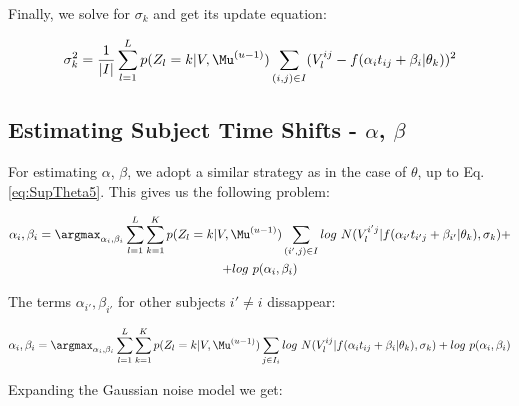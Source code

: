 
Finally, we solve for $\sigma_k$ and get its update equation: 

\begin{equation}
\label{eq:SupThetaFinal}
 \sigma_k^2 = \frac{1}{|I|} \sum_{l=1}^L p(Z_l = k | V, \Mu^{(u-1)}) \sum_{(i,j) \in I} (V_l^{ij} - f(\alpha_i t_{ij} + \beta_i | \theta_k))^2
\end{equation}

% 


\subsection{Estimating Subject Time Shifts - $\alpha$, $\beta$}

For estimating $\alpha$, $\beta$, we adopt a similar strategy as in the case of $\theta$, up to Eq. \ref{eq:SupTheta5}. This gives us the following problem:

\begin{multline}
 \alpha_i, \beta_i = \argmax_{\alpha_i, \beta_i} \sum_{l=1}^L \sum_{k = 1}^K p(Z_l = k | V, \Mu^{(u-1)}) \sum_{(i',j) \in I} log\ N(V_l^{i'j} | f(\alpha_{i'} t_{i'j} + \beta_{i'} | \theta_{k}), \sigma_{k}) + \\ + log\ p(\alpha_i, \beta_i)
\end{multline}

The terms $\alpha_{i'}, \beta_{i'}$ for other subjects $i' \neq i$ dissappear:

\begin{equation}
 \alpha_i, \beta_i = \argmax_{\alpha_i, \beta_i} \sum_{l=1}^L \sum_{k = 1}^K p(Z_l = k | V, \Mu^{(u-1)}) \sum_{j \in I_i} log\ N(V_l^{ij} | f(\alpha_{i} t_{ij} + \beta_{i} | \theta_{k}), \sigma_{k}) + log\ p(\alpha_i, \beta_i)
\end{equation}

Expanding the Gaussian noise model we get:


